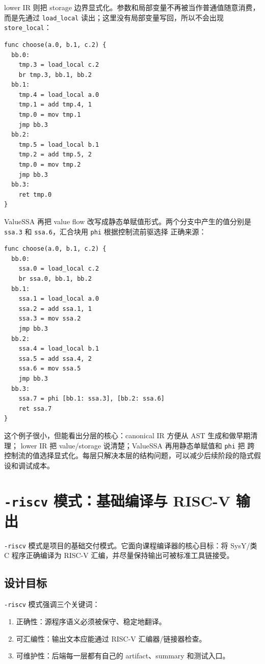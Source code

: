 \documentclass[UTF8,a4paper,11pt]{ctexart}
\begin{document}
lower IR 则把 storage 边界显式化。参数和局部变量不再被当作普通值随意消费，
而是先通过 \texttt{load\_local} 读出；这里没有局部变量写回，所以不会出现
\texttt{store\_local}：

\begin{lstlisting}[language={}]
func choose(a.0, b.1, c.2) {
  bb.0:
    tmp.3 = load_local c.2
    br tmp.3, bb.1, bb.2
  bb.1:
    tmp.4 = load_local a.0
    tmp.1 = add tmp.4, 1
    tmp.0 = mov tmp.1
    jmp bb.3
  bb.2:
    tmp.5 = load_local b.1
    tmp.2 = add tmp.5, 2
    tmp.0 = mov tmp.2
    jmp bb.3
  bb.3:
    ret tmp.0
}
\end{lstlisting}

ValueSSA 再把 value flow 改写成静态单赋值形式。两个分支中产生的值分别是
\texttt{ssa.3} 和 \texttt{ssa.6}，汇合块用 \texttt{phi} 根据控制流前驱选择
正确来源：

\begin{lstlisting}[language={}]
func choose(a.0, b.1, c.2) {
  bb.0:
    ssa.0 = load_local c.2
    br ssa.0, bb.1, bb.2
  bb.1:
    ssa.1 = load_local a.0
    ssa.2 = add ssa.1, 1
    ssa.3 = mov ssa.2
    jmp bb.3
  bb.2:
    ssa.4 = load_local b.1
    ssa.5 = add ssa.4, 2
    ssa.6 = mov ssa.5
    jmp bb.3
  bb.3:
    ssa.7 = phi [bb.1: ssa.3], [bb.2: ssa.6]
    ret ssa.7
}
\end{lstlisting}

这个例子很小，但能看出分层的核心：canonical IR 方便从 AST 生成和做早期清理；
lower IR 把 value/storage 说清楚；ValueSSA 再用静态单赋值和 \texttt{phi} 把
跨控制流的值选择显式化。每层只解决本层的结构问题，可以减少后续阶段的隐式假设和调试成本。

\section{\texttt{-riscv} 模式：基础编译与 RISC-V 输出}

\texttt{-riscv} 模式是项目的基础交付模式。它面向课程编译器的核心目标：将
SysY/类 C 程序正确编译为 RISC-V 汇编，并尽量保持输出可被标准工具链接受。

\subsection{设计目标}

\texttt{-riscv} 模式强调三个关键词：

\begin{enumerate}[label=\arabic*.]
  \item 正确性：源程序语义必须被保守、稳定地翻译。
  \item 可汇编性：输出文本应能通过 RISC-V 汇编器/链接器检查。
  \item 可维护性：后端每一层都有自己的 artifact、summary 和测试入口。
\end{enumerate}
\end{document}

